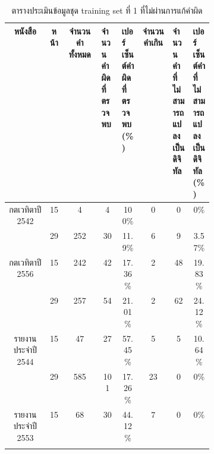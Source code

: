 \begin{table}[H]
    \caption{ตารางประเมินข้อมูลชุด training set ที่ 1 ที่ไม่ผ่านการแก้คำผิด}\label{tbl:correction}
    \begin{tabular}{|c|c|c|p{0.1\linewidth}|p{0.1\linewidth}|c|p{0.1\linewidth}|p{0.1\linewidth}|}
        \hline
        หนังสือ                             & หน้า                       & จำนวนคำทั้งหมด & จำนวนคำผิดที่ตรวจพบ & เปอร์เซ็นต์คำผิดที่ตรวจพบ(\%)    & จำนวนคำเกิน & จำนวนคำที่ไม่สามารถแปลงเป็นดิจิทัล & เปอร์เซ็นต์คำที่ไม่สามารถแปลงเป็นดิจิทัล(\%)    \\ \hline
        \multirow{2}{*}{กตเวทิตาปี 2542}    & 15                           & \multicolumn{1}{c|}{4}         & \multicolumn{1}{c|}{4}          & \multicolumn{1}{c|}{100\%}   & 0      & \multicolumn{1}{c|}{0}               & \multicolumn{1}{c|}{0\%}     \\ \cline{2-8} 
                                            & 29                         & \multicolumn{1}{c|}{252 }      & \multicolumn{1}{c|}{30 }         & \multicolumn{1}{c|}{11.9\% } & \multicolumn{1}{c|}{6 }     & \multicolumn{1}{c|}{9  }             & \multicolumn{1}{c|}{3.57\% } \\ \hline
        \multirow{2}{*}{กตเวทิตาปี 2556}    & 15                           & \multicolumn{1}{c|}{242 }      & \multicolumn{1}{c|}{42 }         & \multicolumn{1}{c|}{17.36\%} & \multicolumn{1}{c|}{2 }     & \multicolumn{1}{c|}{48 }             & \multicolumn{1}{c|}{19.83\%} \\ \cline{2-8} 
                                            & 29                         & \multicolumn{1}{c|}{257 }      & \multicolumn{1}{c|}{54 }         & \multicolumn{1}{c|}{21.01\%} & \multicolumn{1}{c|}{2 }     & \multicolumn{1}{c|}{62 }             & \multicolumn{1}{c|}{24.12\%} \\ \hline
        \multirow{2}{*}{รายงานประจำปี 2544} & 15                           & \multicolumn{1}{c|}{47  }      & \multicolumn{1}{c|}{27 }         & \multicolumn{1}{c|}{57.45\%} & \multicolumn{1}{c|}{5 }     & \multicolumn{1}{c|}{5  }             & \multicolumn{1}{c|}{10.64\%} \\ \cline{2-8} 
                                            & 29                         & \multicolumn{1}{c|}{585 }      & \multicolumn{1}{c|}{101}         & \multicolumn{1}{c|}{17.26\%} & \multicolumn{1}{c|}{23}     & \multicolumn{1}{c|}{0  }             & \multicolumn{1}{c|}{0\%    } \\ \hline
        \multirow{2}{*}{รายงานประจำปี 2553} & 15                           & \multicolumn{1}{c|}{68  }      & \multicolumn{1}{c|}{30 }         & \multicolumn{1}{c|}{44.12\%} & \multicolumn{1}{c|}{7 }     & \multicolumn{1}{c|}{0  }             & \multicolumn{1}{c|}{0\%    } \\ \cline{2-8} 

\end{tabular}
\end{table}
